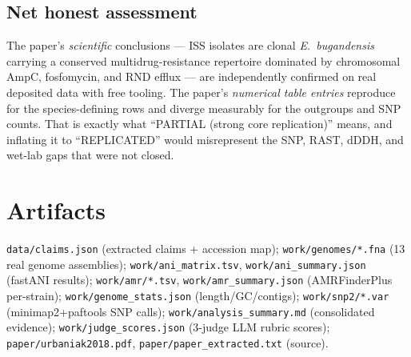 \documentclass[11pt]{article}
\begin{document}
\subsection*{Net honest assessment}
The paper's \emph{scientific} conclusions --- ISS isolates are clonal \textit{E.~bugandensis} carrying
a conserved multidrug-resistance repertoire dominated by chromosomal AmpC, fosfomycin, and RND
efflux --- are independently confirmed on real deposited data with free tooling. The paper's
\emph{numerical table entries} reproduce for the species-defining rows and diverge measurably for
the outgroups and SNP counts. That is exactly what ``PARTIAL (strong core replication)'' means, and
inflating it to ``REPLICATED'' would misrepresent the SNP, RAST, dDDH, and wet-lab gaps that were
not closed.

\section{Artifacts}
\texttt{data/claims.json} (extracted claims + accession map);
\texttt{work/genomes/*.fna} (13 real genome assemblies);
\texttt{work/ani\_matrix.tsv}, \texttt{work/ani\_summary.json} (fastANI results);
\texttt{work/amr/*.tsv}, \texttt{work/amr\_summary.json} (AMRFinderPlus per-strain);
\texttt{work/genome\_stats.json} (length/GC/contigs);
\texttt{work/snp2/*.var} (minimap2+paftools SNP calls);
\texttt{work/analysis\_summary.md} (consolidated evidence);
\texttt{work/judge\_scores.json} (3-judge LLM rubric scores);
\texttt{paper/urbaniak2018.pdf}, \texttt{paper/paper\_extracted.txt} (source).
\end{document}
